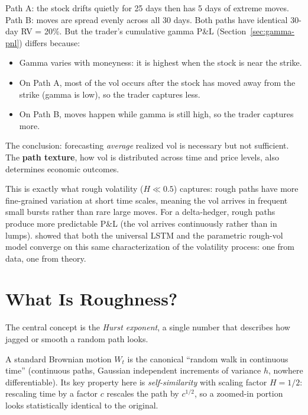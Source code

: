 \begin{intuition}
Path A: the stock drifts quietly for 25 days then has 5 days of extreme moves.
Path B: moves are spread evenly across all 30 days.
Both paths have identical 30-day RV = 20\%.
But the trader's cumulative gamma P\&L (Section~\ref{sec:gamma-pnl}) differs because:
\begin{itemize}[nosep]
  \item Gamma varies with moneyness: it is highest when the stock is near the strike.
  \item On Path A, most of the vol occurs after the stock has moved away from the strike (gamma is low), so the trader captures less.
  \item On Path B, moves happen while gamma is still high, so the trader captures more.
\end{itemize}
The conclusion: forecasting \emph{average} realized vol is necessary but not sufficient.
The \textbf{path texture}, how vol is distributed across time and price levels, also determines economic outcomes.
\end{intuition}

This is exactly what rough volatility ($H \ll 0.5$) captures: rough paths have more fine-grained variation at short time scales, meaning the vol arrives in frequent small bursts rather than rare large moves.
For a delta-hedger, rough paths produce more predictable P\&L (the vol arrives continuously rather than in lumps).
\citet{RosenbaumZhang2022} showed that both the universal LSTM and the parametric rough-vol model converge on this same characterization of the volatility process: one from data, one from theory.

\section{What Is Roughness?}
\label{sec:roughness}

The central concept is the \emph{Hurst exponent}, a single number that describes how jagged or smooth a random path looks.

\begin{prereq}
A standard Brownian motion $W_t$ is the canonical ``random walk in continuous time'' (continuous paths, Gaussian independent increments of variance $h$, nowhere differentiable).
Its key property here is \emph{self-similarity} with scaling factor $H = 1/2$: rescaling time by a factor $c$ rescales the path by $c^{1/2}$, so a zoomed-in portion looks statistically identical to the original.
\end{prereq}

